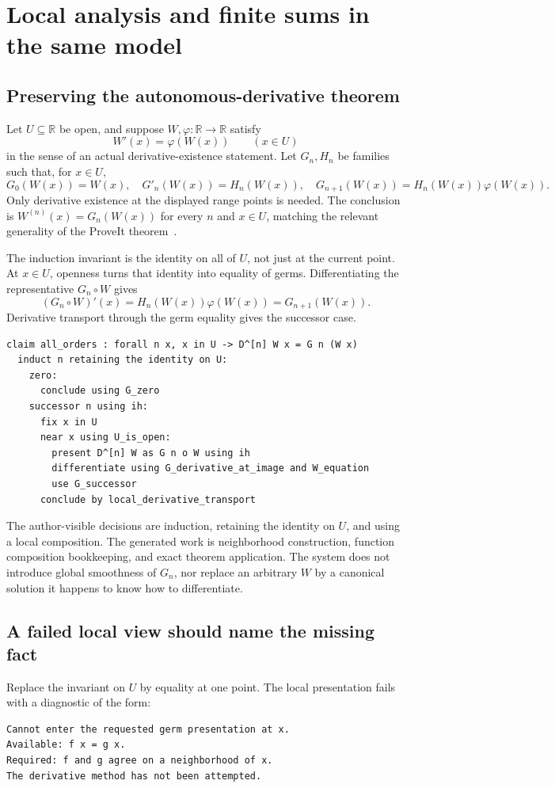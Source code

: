 \documentclass[11pt,a4paper]{article}
\newcommand{\R}{\mathbb R}
\theoremstyle{definition}
\begin{document}
\section{Local analysis and finite sums in the same model}\label{sec:analysis}
\subsection{Preserving the autonomous-derivative theorem}
Let \(U\subseteq\R\) be open, and suppose \(W,\varphi:\R\to\R\) satisfy
\[
 W'(x)=\varphi(W(x))\qquad(x\in U)
\]
in the sense of an actual derivative-existence statement. Let \(G_n,H_n\) be
families such that, for \(x\in U\),
\[
 G_0(W(x))=W(x),\quad
 G'_n(W(x))=H_n(W(x)),\quad
 G_{n+1}(W(x))=H_n(W(x))\varphi(W(x)).
\]
Only derivative existence at the displayed range points is needed. The conclusion
is \(W^{(n)}(x)=G_n(W(x))\) for every \(n\) and \(x\in U\), matching the
relevant generality of the ProveIt theorem~\cite{p-ode}.

The induction invariant is the identity on all of \(U\), not just at the current
point. At \(x\in U\), openness turns that identity into equality of germs.
Differentiating the representative \(G_n\circ W\) gives
\[
 (G_n\circ W)'(x)=H_n(W(x))\varphi(W(x))=G_{n+1}(W(x)).
\]
Derivative transport through the germ equality gives the successor case.

\begin{lstlisting}
claim all_orders : forall n x, x in U -> D^[n] W x = G n (W x)
  induct n retaining the identity on U:
    zero:
      conclude using G_zero
    successor n using ih:
      fix x in U
      near x using U_is_open:
        present D^[n] W as G n o W using ih
        differentiate using G_derivative_at_image and W_equation
        use G_successor
      conclude by local_derivative_transport
\end{lstlisting}

The author-visible decisions are induction, retaining the identity on \(U\), and
using a local composition. The generated work is neighborhood construction,
function composition bookkeeping, and exact theorem application. The system does
not introduce global smoothness of \(G_n\), nor replace an arbitrary \(W\) by a
canonical solution it happens to know how to differentiate.

\subsection{A failed local view should name the missing fact}
Replace the invariant on \(U\) by equality at one point. The local presentation
fails with a diagnostic of the form:
\begin{lstlisting}
Cannot enter the requested germ presentation at x.
Available: f x = g x.
Required: f and g agree on a neighborhood of x.
The derivative method has not been attempted.
\end{lstlisting}
\end{document}
